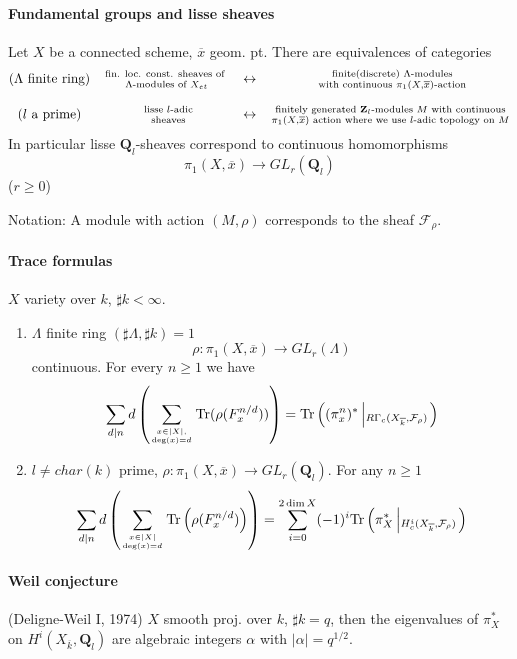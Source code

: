 \paragraph{Fundamental groups and lisse sheaves}
	Let $X$ be a connected scheme, $\overline x$ geom. pt. There are 
equivalences of categories 
$$
\begin{matrix}
		\text{($\Lambda$ finite ring)}& \text{fin. loc. const. sheaves 
of }
		\atop \Lambda\text{-modules of }X_{et} & \leftrightarrow & 
\text{ finite(discrete) }\Lambda\text{-modules}\atop\text{ with continuous 
}\pi_1(X, \overline x)\text{-action}\\
		\\
		(l\text{ a prime}) & \text{ lisse }l\text{-adic}\atop\text{ 
sheaves} & \leftrightarrow & \text{ finitely generated 
}\mathbf{Z}_l\text{-modules } M \text{ with continuous }\atop \pi_1(X, 
\overline x)\text{ action where we use $l$-adic topology on } M
\end{matrix}
$$
In particular lisse $\mathbf{Q}_l$-sheaves correspond to continuous 
homomorphisms 
	$$\pi_1(X, \overline x) \to GL_r(\mathbf{Q}_l)$$
	($r\geq 0$)
	
Notation: A module with action $(M, \rho)$ corresponds to the sheaf 
$\mathcal{F}_\rho$. 

\paragraph{Trace formulas} $X$ variety over $k$, $\sharp k<\infty$. 
\begin{enumerate}
	\item $\Lambda$ finite ring $(\sharp \Lambda, \sharp k)=1$
		$$\rho: \pi_1(X, \overline x)\to GL_r(\Lambda)$$
		continuous. For every $n\geq 1$ we have
		$$\sum_{d|n}d\left(\sum_{x\in |X|, 
\atop\deg(x)=d}\text{Tr}(\rho(F_x^{n/d}))\right) = 
\text{Tr}\left((\pi_x^n)^*\left|_{R\Gamma_c(X_{\overline k}, 
\mathcal{F}_\rho)}\right.\right)$$
		
	\item $l\neq char(k)$ prime, $\rho: \pi_1(X, \overline x)\to 
GL_r(\mathbf{Q}_l)$. For any $n\geq 1$
		$$\sum_{d|n}d\left(\sum_{x\in |X|\atop 
\deg(x)=d}\text{Tr}\left(\rho(F_x^{n/d})\right)\right)=\sum_{i=0}^{2\dim 
X}(-1)^i \text{Tr}\left(\pi_X^*\left|_{H_c^i(X_{\overline k}, 
\mathcal{F}_\rho)}\right.\right)$$
\end{enumerate}

\paragraph{Weil conjecture}  (Deligne-Weil I, 1974) $X$ smooth proj. over $k$, 
$\sharp k=q$, then the eigenvalues of $\pi_X^*$ on $H^i(X_{\overline k}, 
\mathbf{Q}_l)$ are algebraic integers $\alpha$ with $|\alpha|=q^{1/2}$. 

